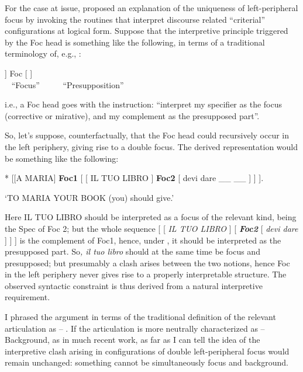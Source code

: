 \documentclass[output=paper]{LSP/langsci}
\begin{document}
For the case at issue, \citet{Rizzi1997} proposed an explanation of the uniqueness of left-peripheral focus by invoking the routines that interpret discourse related “criterial” configurations at logical form. Suppose that the interpretive principle triggered by the Foc head is something like the following, in terms of a traditional terminology of, e.g., \citet{Jackendoff1972}:

\ea%
    \label{ex:rizzi:4} 
\gll {[}    {}     ]   Foc     [  {}  ]   {}\\
               ~ “Focus”  ~  ~      ~ “Presupposition”\\
\z

i.e., a Foc head goes with the instruction: “interpret my specifier as the focus (corrective or mirative), and my complement as the presupposed part”. 

So, let’s suppose, counterfactually, that the Foc head could recursively occur in the left periphery, giving rise to a double focus. The derived representation would be something like the following:

\ea%
    \label{ex:rizzi:5} 
	 *  [[A MARIA]    \textbf{Foc1}    [    [ IL TUO LIBRO ]   \textbf{Foc2}      [   devi dare  \_\_ \_\_ ]  ]  ].

\glt ‘TO MARIA                       YOUR BOOK                        (you) should give.’
\z

Here IL TUO LIBRO should be interpreted as a focus of the relevant kind, being the Spec of Foc 2; but the whole sequence   [ [ \textit{IL TUO LIBRO} ]   [ \textbf{\textit{Foc2}} [ \textit{devi dare} ] ] ]  is the complement of Foc1, hence, under , it  should be interpreted as the presupposed part. So\textit{, il tuo libro} should at the same time be focus and presupposed; but presumably a clash arises between the two notions, hence Foc  in the left periphery never gives rise to a properly interpretable structure. The observed syntactic constraint is thus derived from a natural interpretive requirement. 

I phrased the argument in terms of the traditional definition of the relevant articulation as  –  \citep{Jackendoff1972}. If the articulation is more neutrally characterized as  – Background, as in much recent work, as far as I can tell the idea of the interpretive clash arising in configurations of double left-peripheral focus would remain unchanged: something cannot be simultaneously focus and background.
\end{document}
